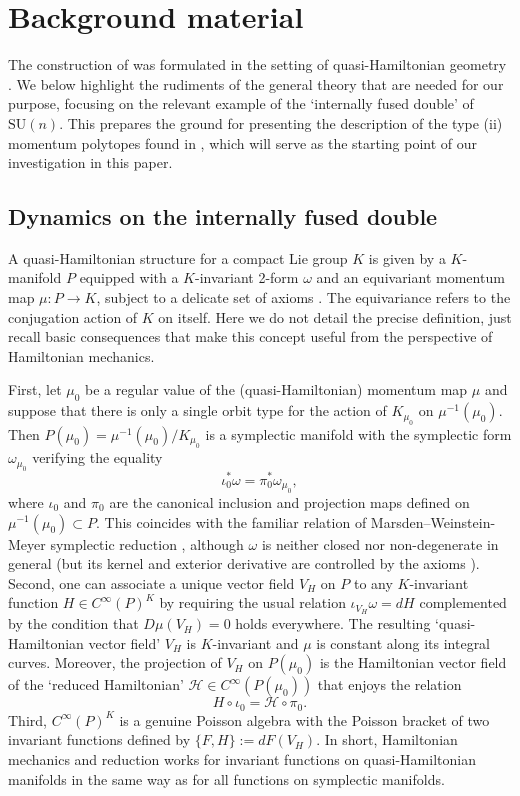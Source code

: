 \documentclass[a4paper,11pt,reqno]{amsart}
\theoremstyle{definition}
\numberwithin{equation}{section}
\newcommand{\be}{\begin{equation}}
\newcommand{\ee}{\end{equation}}
\def\SU{\mathrm{SU}}                        %
\def\cH{{\mathcal H}}                       %
\begin{document}
\section{Background material}\label{Sec2}

The construction of \cite{FK} was formulated in the setting of quasi-Hamiltonian geometry \cite{AMM}.
We below highlight the rudiments  of the general theory that are needed for our purpose,
focusing on the relevant example of the `internally fused double' of $\SU(n)$.
This prepares the ground  for presenting the description of the type (ii) momentum polytopes found in \cite{FK},
which will serve as the starting point of our investigation in this paper.


\subsection{Dynamics on the internally fused double}\label{Sec21}

A quasi-Hamiltonian structure for a compact Lie group $K$ is given by a $K$-manifold $P$
equipped with  a  $K$-invariant 2-form $\omega$
and an  equivariant momentum map $\mu: P \to K$, subject to a delicate set of axioms \cite{AMM}.
The equivariance refers to the conjugation action of $K$ on itself.
Here we do not detail the precise definition, just recall basic consequences \cite{AMM}
that make this concept useful from the perspective of Hamiltonian mechanics.

First, let $\mu_0$ be a regular value of the (quasi-Hamiltonian) momentum map $\mu$ and suppose that there
is only a single orbit type for the action of
 $K_{\mu_0}$ on $\mu^{-1}(\mu_0)$.
 Then $P(\mu_0) = \mu^{-1}(\mu_0)/K_{\mu_0}$ is a symplectic manifold with the symplectic form $\omega_{\mu_0}$
 verifying the equality
 \be
 \iota_0^* \omega = \pi_0^* \omega_{\mu_0},
 \label{T1}\ee
 where $\iota_0$ and $\pi_0$ are the canonical inclusion and projection maps defined on $\mu^{-1}(\mu_0)\subset P$.
 This coincides with the familiar relation of Marsden--Weinstein-Meyer symplectic reduction \cite{OR}, although
 $\omega$ is neither closed nor non-degenerate in general (but its kernel and exterior derivative
 are controlled by the axioms \cite{AMM}).
Second, one can associate a unique vector field $V_H$ on $P$
to any $K$-invariant function $H\in C^\infty(P)^K$ by requiring the usual relation
$\iota_{V_H} \omega = dH$ complemented by the condition that $D\mu(V_H)=0$ holds everywhere.
 The resulting `quasi-Hamiltonian vector field' $V_H$ is $K$-invariant and $\mu$ is constant along its integral curves.
Moreover, the projection of $V_H$ on $P(\mu_0)$  is the Hamiltonian
vector field of the `reduced Hamiltonian' $\cH \in C^\infty(P(\mu_0))$ that enjoys the relation
\be
H \circ \iota_0 =\cH \circ \pi_0.
\label{I.4}\ee
Third,  $C^\infty(P)^K$ is a genuine Poisson algebra with the Poisson bracket of two invariant functions
defined by $\{F,H\}:= dF(V_H)$.
In short, Hamiltonian mechanics and reduction works for invariant functions on quasi-Hamiltonian manifolds
 in the same
way as for all functions on symplectic manifolds.
\end{document}
